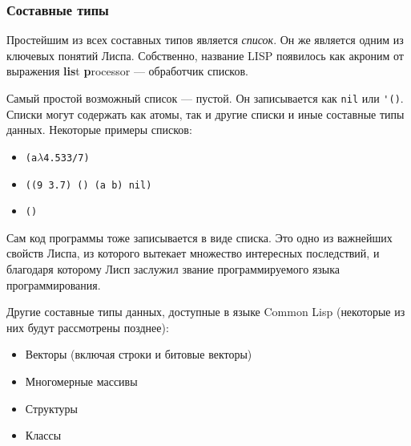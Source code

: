 \documentclass[a4paper, 12pt, titlepage, twoside]{article}
\begin{document}
\subsubsection{Составные типы}
Простейшим из всех составных типов является \textit{список}. Он же является одним из ключевых понятий Лиспа. Собственно, название LISP появилось как акроним от выражения \textbf{lis}t \textbf{p}rocessor --- обработчик списков.

Самый простой возможный список --- пустой. Он записывается как \verb|nil| или \verb|'()|. Списки могут содержать как атомы, так и другие списки и иные составные типы данных. Некоторые примеры списков:
\begin{itemize}
  \item \begin{alltt}(a \(\lambda\) 4.5 33/7)\end{alltt}
  \item \verb|((9 3.7) () (a b) nil)|
  \item \verb|()|
\end{itemize}
Сам код программы тоже записывается в виде списка. Это одно из важнейших свойств Лиспа, из которого вытекает множество интересных последствий, и благодаря которому Лисп заслужил звание программируемого языка программирования.

Другие составные типы данных, доступные в языке Common Lisp (некоторые из них будут рассмотрены позднее):
\begin{itemize}
\item Векторы (включая строки и битовые векторы)
\item Многомерные массивы
\item Структуры
\item Классы
\end{itemize}
\end{document}
